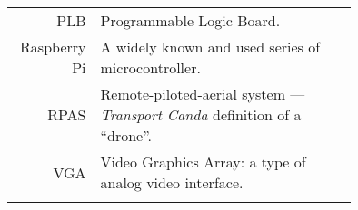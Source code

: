 \begin{tabular}[h]{rp{0.75\linewidth}}
    PLB & Programmable Logic Board. \\
    Raspberry Pi & A widely known and used series of microcontroller. \\
    RPAS & Remote-piloted-aerial system --- \textit{Transport Canda} definition of a ``drone''.\\
    VGA & Video Graphics Array: a type of analog video interface. \\
     & \\

    \hline

\end{tabular}
